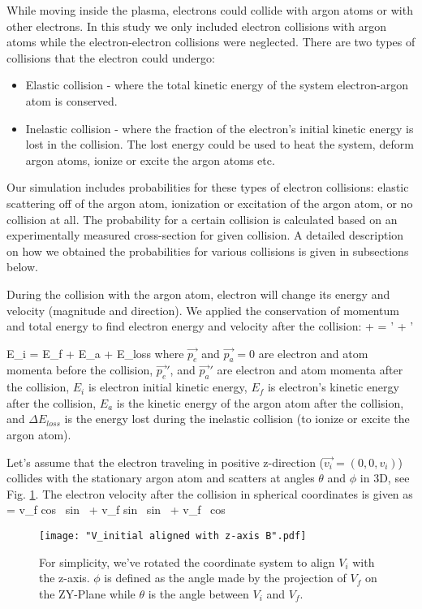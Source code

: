 \documentclass[12pt]{article}
\begin{document}
While moving inside the plasma, electrons could collide with argon atoms or with other electrons. In this study we only included electron collisions with argon atoms while the electron-electron collisions were neglected. There are two types of collisions that the electron could undergo:
\begin{itemize}
\item Elastic collision - where the total kinetic energy of the system electron-argon atom is conserved.
\item Inelastic collision - where the fraction of the electron's initial kinetic energy is lost in the collision. The lost energy could be used to heat the system, deform argon atoms, ionize or excite the argon atoms etc.
\end{itemize}
Our simulation includes probabilities for these types of electron collisions: elastic scattering off of the argon atom, ionization or excitation of the argon atom, or no collision at all. The probability for a certain collision is calculated based on an experimentally measured cross-section for given collision. A detailed description on how we obtained the probabilities for various collisions is given in subsections below.

During the collision with the argon atom, electron will change its energy and velocity (magnitude and direction). We applied the conservation of momentum and total energy to find electron energy and velocity after the collision:
\beqn
{} +  = ' +  ' 
\label{conserve momentum p}
\eeqn

\beqn
E_i = E_f + E_a + \Delta E_{loss}
\label{coserve energy E}
\eeqn
where $\vec{p_e}$ and $\vec{p_a}=0$ are electron and atom momenta before the collision, $\vec{p_e}'$, and $\vec{p_a}'$ are electron and atom momenta after the collision, $E_i$ is electron initial kinetic energy, $E_f$ is electron's kinetic energy after the collision, $E_a$ is the kinetic energy of the argon atom after the collision, and $\Delta E_{loss}$ is the energy lost during the inelastic collision (to ionize or excite the argon atom). 

Let's assume that the electron traveling in positive z-direction ($\vec{v_i}=(0,0,v_i)$) collides with the stationary argon atom and scatters at angles $\theta$ and $\phi$ in 3D, see Fig. \ref{3D Collision In Rotated Coordinate System}.
The electron velocity after the collision in spherical coordinates is given as
\beqn
{} = v_f cos \phi \, sin \theta \,  +  v_f sin \phi \, sin \theta \,  + v_f \, cos \theta \, 
\label{final velocity}
\eeqn
\begin{figure}[H]
	\centering
	\texttt{[image: "V\_initial aligned with z-axis B".pdf]}
	\caption{For simplicity, we've rotated the coordinate system to align $V_{i}$ with the z-axis. $\phi$ is defined as the angle made by the projection of $V_{f}$ on the ZY-Plane while $\theta$ is the angle between $V_{i}$ and $V_{f}$.}
	\label{3D Collision In Rotated Coordinate System}
\end{figure}
\end{document}
